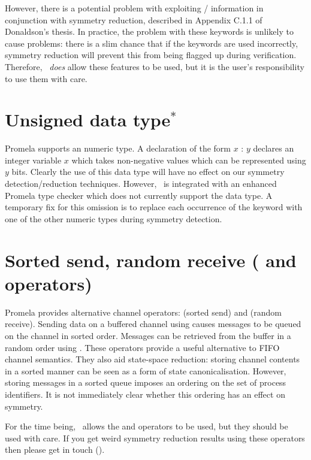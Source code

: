 However, there is a potential problem with exploiting
/ information in conjunction with symmetry
reduction, described in Appendix C.1.1 of Donaldson's thesis.  In practice, the
problem with these keywords is unlikely to cause problems: there
is a slim chance that if the keywords are used incorrectly, symmetry reduction
will prevent this from being flagged up during verification.  Therefore, \topspin\
\emph{does} allow these features to be used, but it is the user's responsibility to
use them with care.



\section{Unsigned data type$^\ast$}

Promela supports an 
numeric type. A declaration of the form  $x$ : $y$
declares an integer variable $x$ which takes non-negative values
which can be represented using $y$ bits.  Clearly the use of this
data type will have no effect on our symmetry detection/reduction
techniques. However, \topspin\ is integrated with an enhanced
Promela type checker which does not currently support the 
data type.  A temporary fix for this omission is to replace each occurrence of the
\inline{unsigned} keyword with one of the other numeric types during
symmetry detection.

\section{Sorted send, random receive (\protect\inline{!!} and \protect{} operators)}

Promela provides alternative channel operators: \inline{!!} (sorted
send) and \inline{??} (random receive).
Sending data on a buffered channel using \inline{!!} causes messages to be queued on the
channel in sorted order. Messages can be retrieved from the buffer
in a random order using \inline{??}. These operators provide a
useful alternative to FIFO channel semantics. They also aid
state-space reduction: storing channel contents in a sorted manner
can be seen as a form of state canonicalisation. However, storing
\inline{pid} messages in a sorted queue imposes an ordering on the set
of process identifiers.  It is not immediately clear whether this
ordering has an effect on symmetry.

For the time being, \topspin\ allows the \inline{!!} and  operators to be
used, but they should be used with care.  If you get weird symmetry reduction
results using these operators then please get in touch ().


